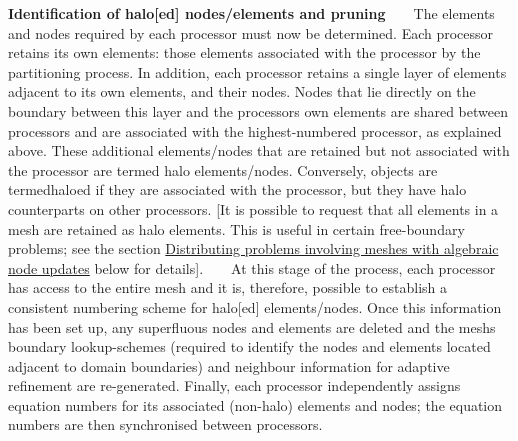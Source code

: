 \begin{DoxyItemize}
\item {\bfseries Identification of halo\mbox{[}ed\mbox{]} nodes/elements and pruning} ~\newline
~\newline
 The elements and nodes required by each processor must now be determined. Each processor retains its own elements\+: those elements associated with the processor by the partitioning process. In addition, each processor retains a single layer of elements adjacent to its own elements, and their nodes. Nodes that lie directly on the boundary between this layer and the processor\textquotesingle{}s own elements are shared between processors and are associated with the highest-\/numbered processor, as explained above. These additional elements/nodes that are retained but not associated with the processor are termed {\ttfamily halo\textquotesingle{}\textquotesingle{} elements/nodes. Conversely, objects are termed}haloed\textquotesingle{}\textquotesingle{} if they are associated with the processor, but they have halo counterparts on other processors. \mbox{[}It is possible to request that all elements in a mesh are retained as halo elements. This is useful in certain free-\/boundary problems; see the section \hyperlink{index_alg_node_update}{Distributing problems involving meshes with algebraic node updates} below for details\mbox{]}. ~\newline
~\newline
 At this stage of the process, each processor has access to the entire mesh and it is, therefore, possible to establish a consistent numbering scheme for halo\mbox{[}ed\mbox{]} elements/nodes. Once this information has been set up, any superfluous nodes and elements are deleted and the mesh\textquotesingle{}s boundary lookup-\/schemes (required to identify the nodes and elements located adjacent to domain boundaries) and neighbour information for adaptive refinement are re-\/generated. Finally, each processor independently assigns equation numbers for its associated (non-\/halo) elements and nodes; the equation numbers are then synchronised between processors.
\end{DoxyItemize}

